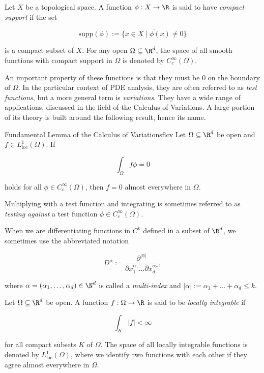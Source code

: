 Let $X$ be a topological space. A function $\phi: X \to \R$ is said to have \emph{compact support} if the set

\begin{equation*}
    \text{supp}(\phi) := \overline{\{ x \in X \mid \phi (x) \neq 0 \}}
\end{equation*}

\noindent
is a compact subset of $X$. For any open $\Omega \subseteq \R^d$, the space of all smooth functions with compact support in $\Omega$ is denoted by $C^\infty_c(\Omega)$.

An important property of these functions is that they must be 0 on the boundary of $\Omega$. In the particular context of PDE analysis, they are often referred to as \emph{test functions}, but a more general term is \emph{variations}. They have a wide range of applications, discussed in the field of the Calculus of Variations. A large portion of its theory is built around the following result, hence its name.

\begin{lemma}{Fundamental Lemma of the Calculus of Variations}{flcv}
    Let $\Omega \subseteq \R^{d}$ be open and $f \in L^{1}_\text{loc}(\Omega)$. If

    \begin{equation*}
        \int_{\Omega} f \phi = 0
    \end{equation*}

    holds for all $\phi \in C^{\infty}_{c}(\Omega)$, then $f = 0$ almost everywhere in $\Omega$.
\end{lemma}

Multiplying with a test function and integrating is sometimes referred to as \emph{testing against} a test function $\phi \in C^\infty_c(\Omega)$. 

\begin{definition}{}{}
    When we are differentiating functions in $C^k$ defined in a subset of $\R^d$, we sometimes use the abbreviated notation

    \begin{equation*}
        D^\alpha := \frac{\partial^{|\alpha|}}{\partial x_1^{\alpha_1} \dots \partial x_d^{\alpha_d}} ,
    \end{equation*}

    where $\alpha = (\alpha_1, \dots, \alpha_d) \in \N^d$ is called a \emph{multi-index} and $|\alpha| := \alpha_1 + \dots + \alpha_d \leq k$.
\end{definition}

\begin{definition}{}{}
    Let $\Omega \subseteq \R^d$ be open. A function $f: \Omega \to \R$ is said to be \emph{locally integrable} if

    \begin{equation*}
        \int_K |f| < \infty
    \end{equation*}

    for all compact subsets $K$ of $\Omega$. The space of all locally integrable functions is denoted by $L^1_\text{loc}(\Omega)$, where we identify two functions with each other if they agree almost everywhere in $\Omega$.
\end{definition}

